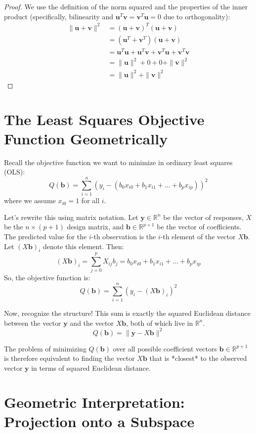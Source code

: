 \documentclass[11pt]{article}
\theoremstyle{definition}
\newcommand{\vect}[1]{\mathbf{#1}} %
\begin{document}
\begin{proof}
We use the definition of the norm squared and the properties of the inner product (specifically, bilinearity and $\vect{u}^T \vect{v} = \vect{v}^T \vect{u} = 0$ due to orthogonality):
\begin{align*}
\|\vect{u} + \vect{v}\|^2 &= (\vect{u} + \vect{v})^T (\vect{u} + \vect{v}) \\
&= (\vect{u}^T + \vect{v}^T) (\vect{u} + \vect{v}) \\
&= \vect{u}^T \vect{u} + \vect{u}^T \vect{v} + \vect{v}^T \vect{u} + \vect{v}^T \vect{v} \\
&= \|\vect{u}\|^2 + 0 + 0 + \|\vect{v}\|^2 \\
&= \|\vect{u}\|^2 + \|\vect{v}\|^2
\end{align*}
\end{proof}

\section{The Least Squares Objective Function Geometrically}

Recall the objective function we want to minimize in ordinary least squares (OLS):
\[ Q(\vect{b}) = \sum_{i=1}^n (y_i - (b_0 x_{i0} + b_1 x_{i1} + \dots + b_p x_{ip}))^2 \]
where we assume $x_{i0}=1$ for all $i$.

Let's rewrite this using matrix notation. Let $\vect{y} \in \mathbb{R}^n$ be the vector of responses, $X$ be the $n \times (p+1)$ design matrix, and $\vect{b} \in \mathbb{R}^{p+1}$ be the vector of coefficients. The predicted value for the $i$-th observation is the $i$-th element of the vector $X\vect{b}$. Let $(X\vect{b})_i$ denote this element. Then:
\[ (X\vect{b})_i = \sum_{j=0}^p X_{ij} b_j = b_0 x_{i0} + b_1 x_{i1} + \dots + b_p x_{ip} \]
So, the objective function is:
\[ Q(\vect{b}) = \sum_{i=1}^n (y_i - (X\vect{b})_i)^2 \]

Now, recognize the structure! This sum is exactly the squared Euclidean distance between the vector $\vect{y}$ and the vector $X\vect{b}$, both of which live in $\mathbb{R}^n$.
\[ Q(\vect{b}) = \|\vect{y} - X\vect{b}\|^2 \]

The problem of minimizing $Q(\vect{b})$ over all possible coefficient vectors $\vect{b} \in \mathbb{R}^{p+1}$ is therefore equivalent to finding the vector $X\vect{b}$ that is *closest* to the observed vector $\vect{y}$ in terms of squared Euclidean distance.

\section{Geometric Interpretation: Projection onto a Subspace}
\end{document}
